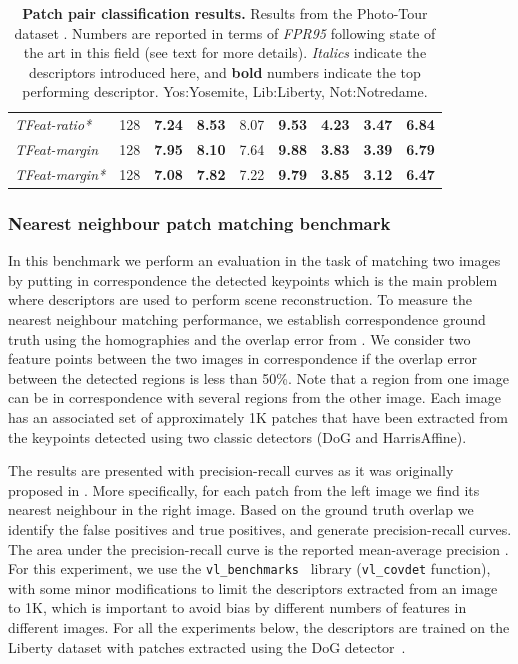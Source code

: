 \begin{table}[h]
{\begin{tabular}{lcccccccc}
 {\em TFeat-ratio*} &  128 & \bf 7.24 & \bf 8.53 &  8.07 & \bf 9.53  & \bf 4.23 & \bf 3.47 & \bf 6.84  \\
 {\em TFeat-margin} &  128 & \bf 7.95 & \bf 8.10 &  7.64 &  \bf 9.88 & \bf 3.83  & \bf 3.39  & \bf 6.79 \\ 
 {\em TFeat-margin*} &  128 & \bf 7.08 & \bf 7.82 & 7.22 &  \bf 9.79  &  \bf 3.85  &  \bf 3.12 & \bf 6.47 \\ 
  \bottomrule
\end{tabular}}
  \caption[Patch pair classification results.]{\textbf{Patch pair classification results.} Results from the Photo-Tour dataset \cite{BHW10}. Numbers
    are reported in terms of {\em FPR95} following state of the art 
    in this field (see text for more details). {\em Italics} indicate
    the descriptors introduced here, and {\bf bold} numbers indicate
    the top performing descriptor. Yos:Yosemite, Lib:Liberty,
    Not:Notredame.}
\label{tab:benchmark_brown} 
\end{table}

\subsubsection{Nearest neighbour patch matching benchmark}

In this benchmark we perform an evaluation in the task of matching two images by putting in correspondence the detected keypoints which is the main problem where descriptors are used to perform scene reconstruction. To measure the nearest neighbour matching performance, we establish correspondence ground truth using the homographies and the overlap error from \cite{schmid2003performance}. We consider two feature points between the two images in correspondence if the overlap error between the detected regions is less than 50\%. Note that a region from one image can be in correspondence with several regions from the other image. Each image has an associated set of approximately 1K patches that have been extracted from the keypoints detected using two classic detectors (DoG and HarrisAffine).

The results are presented with precision-recall curves as it was originally proposed in \cite{schmid2003performance}.  More specifically, for each patch from the left image we find its nearest neighbour in the right image.  Based on the ground truth overlap we identify the false positives and true positives, and generate
precision-recall curves. The area under the precision-recall curve is
the reported mean-average precision \cite{WHB09,ZagoruykoCVPR2015,DBLP:journals/corr/DongS14}. For this
experiment, we use the \texttt{vl\_benchmarks}~\cite{vedaldi08vlfeat} library
(\texttt{vl\_covdet} function), with some minor modifications to limit
the descriptors extracted from an image to 1K, which is important to
avoid bias by different numbers of features in different images. For
all the experiments below, the descriptors are trained on the  Liberty dataset with patches extracted using the DoG detector~\cite{BHW10}.

